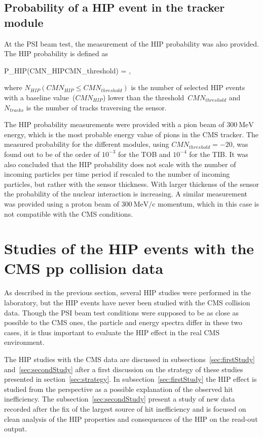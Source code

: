 \subsection{Probability of a HIP event in the tracker module~\label{sec:ProbPast}}

At the PSI beam test, the measurement of the HIP probability was also provided. The HIP probability is defined as 

{
P_{HIP}(CMN_{HIP}\leq CMN_{threshold}) = ,
}

where $N_{HIP}(CMN_{HIP}\leq CMN_{threshold})$ is the number of selected HIP events with a baseline value~($CMN_{HIP}$) lower than the threshold~$CMN_{threshold}$ and $N_{tracks}$ is the number of tracks traversing the sensor.

The HIP probability measurements were provided with a pion beam of $300~\mathrm{MeV}$ energy, which is the most probable energy value of pions in the CMS tracker. The measured probability for the different modules, using $CMN_{threshold}=-20$, was found out to be of the order of $10^{-3}$ for the TOB and $10^{-4}$ for the TIB. It was also concluded that the HIP probability does not scale with the number of incoming particles per time period if rescaled to the number of incoming particles, but rather with the sensor thickness. With larger thickenss of the sensor the probability of the nuclear interaction is increasing.  A similar measurement was provided using a proton beam of  $300~\mathrm{MeV/c}$ momentum, which in this case is not compatible with the CMS conditions.

\newpage

\section{Studies of the HIP events with the CMS pp collision data}

As described in the previous section, several HIP studies were performed in the laboratory, but the HIP events have never been studied with the CMS collision data. Though the PSI beam test conditions were supposed to be as close as possible to the CMS ones, the particle and energy spectra differ in these two cases, it is thus important to evaluate the HIP effect in the real CMS environment.

The HIP studies with the CMS data are discussed in subsections~\ref{sec:firstStudy} and~\ref{sec:secondStudy} after a first discussion on the strategy of these studies presented in section~\ref{sec:strategy}. In subsection~\ref{sec:firstStudy} the HIP effect is studied from the perspective as a possible explanation of the observed hit inefficiency. The subsection~\ref{sec:secondStudy} present a study of new data recorded after the fix of the largest source of hit inefficiency and is focused on clean analysis of the HIP properties and consequences of the HIP on the read-out output.

